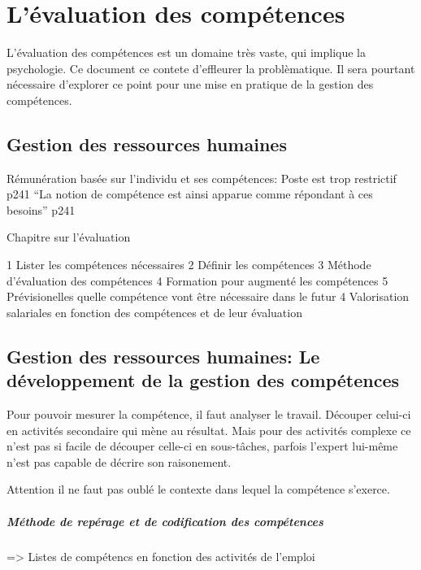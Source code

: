 \chapter{L'évaluation des compétences}
L'évaluation des compétences est un domaine très vaste, qui implique la psychologie. Ce document ce contete d'effleurer la problèmatique. Il sera pourtant nécessaire d'explorer ce point pour une mise en pratique de la gestion des compétences. 





\section{Gestion des ressources humaines} \cite{gestionressourceshumaine2007}


Rémunération basée sur l'individu et ses compétences: Poste est trop restrictif p241
``La notion de compétence est ainsi apparue comme répondant à ces besoins'' p241




Chapitre sur l'évaluation



1 Lister les compétences nécessaires
2 Définir les compétences 
3 Méthode d'évaluation des compétences
4 Formation pour augmenté les compétences
5 Prévisionelles quelle compétence vont être nécessaire dans le futur
4 Valorisation salariales en fonction des compétences et de leur évaluation

\section{Gestion des ressources humaines: Le développement de la gestion des compétences}


Pour pouvoir mesurer la compétence, il faut analyser le travail. Découper celui-ci en activités secondaire qui mène au résultat.
Mais pour des activités complexe ce n'est pas si facile de découper celle-ci en sous-tâches, parfois l'expert lui-même n'est pas capable de décrire son raisonement.

Attention il ne faut pas oublé le contexte dans lequel la compétence s'exerce. 

\paragraph{Méthode de repérage et de codification des compétences}



=> Listes de compétencs en fonction des activités de l'emploi

